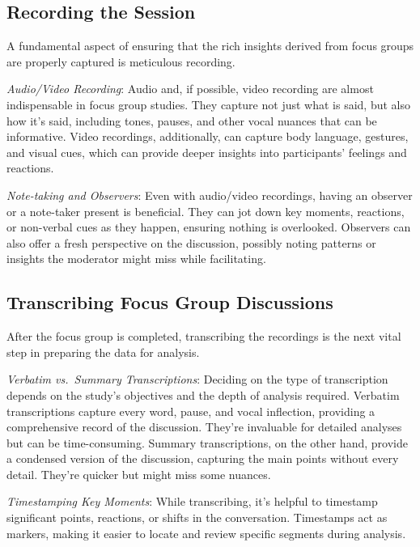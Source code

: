\documentclass[
  b5paper]{book}
\begin{document}
\hypertarget{recording-the-session}{%
\subsection*{Recording the Session}\label{recording-the-session}}

A fundamental aspect of ensuring that the rich insights derived from focus groups are properly captured is meticulous recording.

\emph{Audio/Video Recording}: Audio and, if possible, video recording are almost indispensable in focus group studies. They capture not just what is said, but also how it's said, including tones, pauses, and other vocal nuances that can be informative. Video recordings, additionally, can capture body language, gestures, and visual cues, which can provide deeper insights into participants' feelings and reactions.

\emph{Note-taking and Observers}: Even with audio/video recordings, having an observer or a note-taker present is beneficial. They can jot down key moments, reactions, or non-verbal cues as they happen, ensuring nothing is overlooked. Observers can also offer a fresh perspective on the discussion, possibly noting patterns or insights the moderator might miss while facilitating.

\hypertarget{transcribing-focus-group-discussions}{%
\subsection*{Transcribing Focus Group Discussions}\label{transcribing-focus-group-discussions}}

After the focus group is completed, transcribing the recordings is the next vital step in preparing the data for analysis.

\emph{Verbatim vs.~Summary Transcriptions}: Deciding on the type of transcription depends on the study's objectives and the depth of analysis required. Verbatim transcriptions capture every word, pause, and vocal inflection, providing a comprehensive record of the discussion. They're invaluable for detailed analyses but can be time-consuming. Summary transcriptions, on the other hand, provide a condensed version of the discussion, capturing the main points without every detail. They're quicker but might miss some nuances.

\emph{Timestamping Key Moments}: While transcribing, it's helpful to timestamp significant points, reactions, or shifts in the conversation. Timestamps act as markers, making it easier to locate and review specific segments during analysis.
\end{document}
